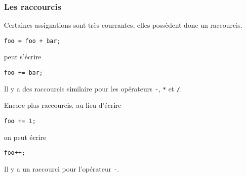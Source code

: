 \subsubsection{Les raccourcis}
Certaines assignations sont très courrantes, elles possèdent donc un raccourcis.
\begin{lstlisting}
foo = foo + bar;
\end{lstlisting}
peut s'écrire
\begin{lstlisting}
foo += bar;
\end{lstlisting}
Il y a des raccourcis similaire pour les opérateurs
\verb|-|, \verb|*| et \verb|/|.

Encore plus raccourcis, au lieu d'écrire
\begin{lstlisting}
foo += 1;
\end{lstlisting}
on peut écrire
\begin{lstlisting}
foo++;
\end{lstlisting}
Il y a un raccourci pour l'opérateur \verb|-|.

